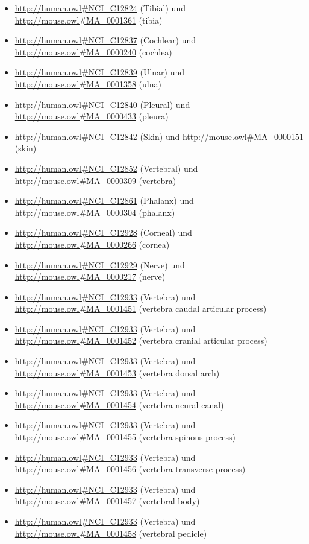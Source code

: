\begin{itemize}
	\item \url{http://human.owl#NCI_C12824} (Tibial\textunderscoreArtery) und \url{http://mouse.owl#MA_0001361} (tibia)
	\item \url{http://human.owl#NCI_C12837} (Cochlear\textunderscoreNuclei) und \url{http://mouse.owl#MA_0000240} (cochlea)
	\item \url{http://human.owl#NCI_C12839} (Ulnar\textunderscoreArtery) und \url{http://mouse.owl#MA_0001358} (ulna)
	\item \url{http://human.owl#NCI_C12840} (Pleural\textunderscoreCavity) und \url{http://mouse.owl#MA_0000433} (pleura)
	\item \url{http://human.owl#NCI_C12842} (Skin\textunderscoreGraft) und \url{http://mouse.owl#MA_0000151} (skin)
	\item \url{http://human.owl#NCI_C12852} (Vertebral\textunderscoreBody) und \url{http://mouse.owl#MA_0000309} (vertebra)
	\item \url{http://human.owl#NCI_C12861} (Phalanx\textunderscoreof\textunderscorethe\textunderscoreHund) und \url{http://mouse.owl#MA_0000304} (phalanx)
	\item \url{http://human.owl#NCI_C12928} (Corneal\textunderscoreEpithelium) und \url{http://mouse.owl#MA_0000266} (cornea)
	\item \url{http://human.owl#NCI_C12929} (Nerve\textunderscorePlexus) und \url{http://mouse.owl#MA_0000217} (nerve)
	\item \url{http://human.owl#NCI_C12933} (Vertebra) und \url{http://mouse.owl#MA_0001451} (vertebra caudal articular process)
	\item \url{http://human.owl#NCI_C12933} (Vertebra) und \url{http://mouse.owl#MA_0001452} (vertebra cranial articular process)
	\item \url{http://human.owl#NCI_C12933} (Vertebra) und \url{http://mouse.owl#MA_0001453} (vertebra dorsal arch)
	\item \url{http://human.owl#NCI_C12933} (Vertebra) und \url{http://mouse.owl#MA_0001454} (vertebra neural canal)
	\item \url{http://human.owl#NCI_C12933} (Vertebra) und \url{http://mouse.owl#MA_0001455} (vertebra spinous process)
	\item \url{http://human.owl#NCI_C12933} (Vertebra) und \url{http://mouse.owl#MA_0001456} (vertebra transverse process)
	\item \url{http://human.owl#NCI_C12933} (Vertebra) und \url{http://mouse.owl#MA_0001457} (vertebral body)
	\item \url{http://human.owl#NCI_C12933} (Vertebra) und \url{http://mouse.owl#MA_0001458} (vertebral pedicle)

\end{itemize}
